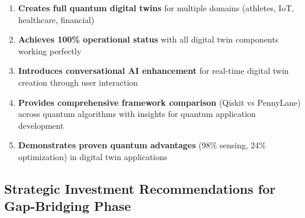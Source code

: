 \documentclass[12pt,a4paper]{article}
\begin{document}
\begin{enumerate}
    \item \textbf{Creates full quantum digital twins} for multiple domains (athletes, IoT, healthcare, financial)
    \item \textbf{Achieves 100\% operational status} with all digital twin components working perfectly
    \item \textbf{Introduces conversational AI enhancement} for real-time digital twin creation through user interaction
    \item \textbf{Provides comprehensive framework comparison} (Qiskit vs PennyLane) across quantum algorithms with insights for quantum application development
    \item \textbf{Demonstrates proven quantum advantages} (98\% sensing, 24\% optimization) in digital twin applications
\end{enumerate}

\subsection{Strategic Investment Recommendations for Gap-Bridging Phase}
\end{document}
